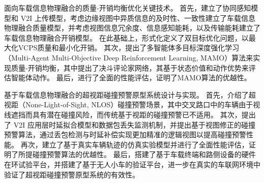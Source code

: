 \begin{cabstract}
 面向车载信息物理融合的质量-开销均衡优化关键技术。
首先，建立了协同感知模型和 V2I 上传模型，考虑边缘视图中异质信息的及时性、一致性建立了车载信息物理融合质量模型，并考虑视图信息冗余度、信息感知能耗，以及传输能耗建立了车载信息物理融合开销模型。
在此基础上，形式化定义了双目标优化问题，以最大化VCPS质量和最小化开销。
其次，提出了多智能体多目标深度强化学习（Multi-Agent Multi-Objective Deep Reinforcement Learning, MAMO）算法来实现质量-开销均衡，其中提出了决斗评论家网络，其基于状态价值和动作优势来评估智能体动作。
最后，进行了全面的性能评估，证明了MAMO算法的优越性。

 基于车载信息物理融合的超视距碰撞预警原型系统设计与实现。
首先，介绍了超视距（None-Light-of-Sight, NLOS）碰撞预警场景，其中交叉路口中的车辆由于视线遮挡而具有潜在碰撞风险，而传统基于视距的碰撞预警已不适用。
其次，提出了 V2I 应用层时延拟合模型和数据包丢失监测机制，并提出基于视图修正的碰撞预警算法，通过丢包检测与时延补偿实现更加精准的逻辑视图以提高碰撞预警性能。
再次，建立了基于真实车辆轨迹的仿真实验模型并进行了全面性能评估，证明了所提碰撞预警算法的优越性。
最后，搭建了基于车载终端和路侧设备的硬件在环试验平台，并搭建了基于无人小车的验证平台，进一步在真实的车联网环境中验证了超视距碰撞预警原型系统的有效性。

\end{cabstract}


